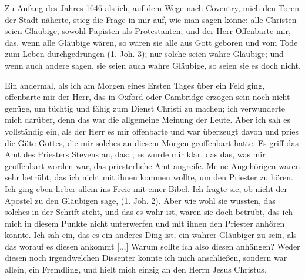 Zu Anfang des Jahres 1646 als ich, auf dem Wege nach
Coventry, mich den Toren der Stadt näherte, stieg die Frage in
mir auf, wie man sagen könne: alle Christen seien Gläubige, sowohl 
Papisten als Protestanten; und der Herr Offenbarte mir,
das, wenn alle Gläubige wären, so wären sie alle aus Gott 
geboren und vom Tode zum Leben durchgedrungen 
(1. Joh. 3);
nur solche seien wahre Gläubige; und wenn auch andere sagen,
sie seien auch wahre Gläubige, so seien sie es doch nicht.

Ein andermal, als ich am Morgen eines Ersten Tages über
ein Feld ging, offenbarte mir der Herr, 
das in Oxford oder 
Cambridge erzogen sein 
noch nicht genüge, um tüchtig und fähig zum
Dienst Christi zu machen; ich verwunderte mich darüber, denn
das war die allgemeine Meinung der Leute. Aber ich sah es
vollständig ein, als der Herr es mir offenbarte und war überzeugt 
davon und pries die Güte Gottes, die mir solches an diesem
Morgen geoffenbart hatte. Es griff das Amt des Priesters Stevens
an, das: ; es
wurde mir klar, das das, was mir geoffenbart worden war, das
priesterliche Amt angreife. Meine Angehörigen waren sehr betrübt,
das ich nicht mit ihnen kommen wollte, um den Priester zu hören.
Ich ging eben lieber allein ins Freie mit einer Bibel. 
Ich fragte sie,
ob nicht der Apostel zu den Gläubigen sage, 
(1. Joh. 2). Aber wie wohl 
sie wussten, das solches in der Schrift steht, und das es
wahr ist, waren sie doch betrübt, das ich mich in diesem Punkte
nicht unterwerfen und mit ihnen den Priester anhören konnte.
Ich sah ein, das es ein anderes Ding ist, ein wahrer Gläubiger
zu sein, als das worauf es diesen ankommt [...] Warum sollte
ich also diesen anhängen? Weder diesen noch irgendwelchen
Dissenter konnte ich mich anschließen, sondern war allein, ein
Fremdling, und hielt mich einzig an den Herrn Jesus Christus.


